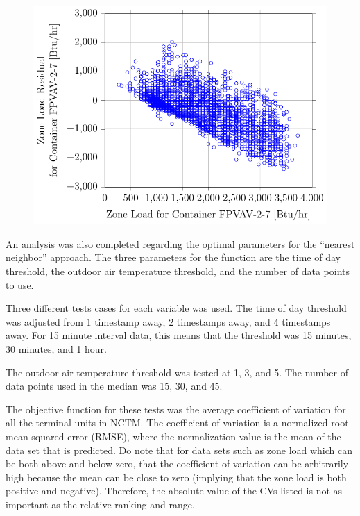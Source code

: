 \begin{figure}
\centering
\includegraphics[]{Plots/2016-09-14-1020-ZoneLoadResidualforContainerFPVAV27vsZoneLoadforContainerFPVAV27.pdf}
\caption{  }
\label{fig:2016-09-14-1020-ZoneLoadResidualforContainerFPVAV27vsZoneLoadforContainerFPVAV27}
\end{figure}


An analysis was also completed regarding the optimal parameters for the
``nearest neighbor'' approach. The three parameters for the function are
the time of day threshold, the outdoor air temperature threshold, and the
number of data points to use.

Three different tests cases for each variable was used. The time of day
threshold was adjusted from 1 timestamp away, 2 timestamps away, and 4
timestamps away. For 15 minute interval data, this means that the
threshold was 15 minutes, 30 minutes, and 1 hour. 

The outdoor air temperature threshold was tested at 1, 3, and
\SI{5}{\degF}. The number of data points used in the median was 15, 30,
and 45. 

The objective function for these tests was the average coefficient of
variation for all the terminal units in NCTM. The coefficient of
variation is a normalized root mean squared error (RMSE), where the
normalization value is the mean of the data set that is predicted. Do note that
for data sets such as zone load which can be both above and below zero,
that the coefficient of variation can be arbitrarily high because
the mean can be close to zero (implying that the zone load is both
positive and negative). Therefore, the absolute value of the CVs listed
is not as important as the relative ranking and range. 

